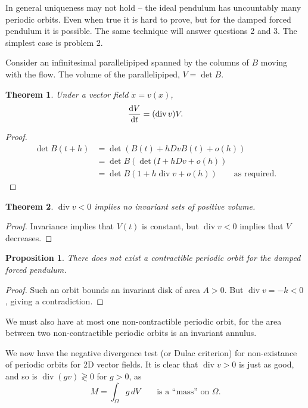 \documentclass{notes}
\theoremstyle{plain}
\newtheorem*{theorem}{Theorem}
\newtheorem*{proposition}{Proposition}
\DeclareMathOperator{\dive}{div}
\begin{document}
In general uniqueness may not hold -- the ideal pendulum has uncountably many
periodic orbits.  Even when true it is hard to prove, but for the damped
forced pendulum it is possible.  The same technique will answer questions 2
and 3.  The simplest case is problem 2.

Consider an infinitesimal parallelipiped spanned by the columns of $B$ moving
with the flow.  The volume of the parallelipiped, $V = \det B$.

\begin{theorem}
Under a vector field $\dot{x} = v(x)$,
\[
\ddt{V} = (\dive v) V.
\]
\end{theorem}

\begin{proof}
\begin{align*}
\det B(t+h) &= \det(B(t) + h Dv B(t) + o(h))\\
&= \det B \left( \det (I + h Dv  + o(h) \right) \\
&= \det B \left( 1 + h \dive v + o(h) \right) \qquad \text{as required.} 
\end{align*}
\end{proof}

\begin{theorem}
$\dive v < 0$ implies no invariant sets of positive volume.
\end{theorem}

\begin{proof}
Invariance implies that $V(t)$ is constant, but $\dive v < 0$ implies 
that $V$ decreases.
\end{proof}

\begin{proposition}
There does not exist a contractible periodic orbit for the damped
forced pendulum.
\end{proposition}

\begin{proof}
Such an orbit bounds an invariant disk of area $A > 0$.  But
$\dive v = -k < 0$, giving a contradiction.
\end{proof}

We must also have at most one non-contractible periodic orbit, for the area
between two non-contractible periodic orbits is an invariant annulus.

We now have the negative divergence test (or Dulac criterion) for non-existance
of periodic orbits for 2D vector fields.  It is clear that
$\dive v > 0$ is just as good, and so is $\dive (gv) \gtrless 0$ for $g > 0$,
as
\[
M = \int_\Omega g\, dV \qquad \text{is a ``mass'' on $\Omega$.}
\]
\end{document}
